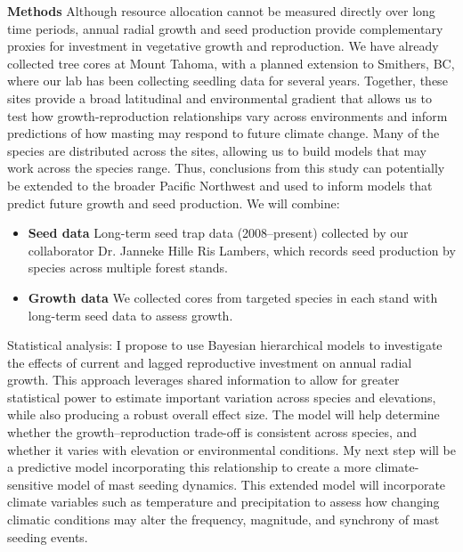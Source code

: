 \documentclass[12pt]{article}
\begin{document}
\textbf{Methods}
Although resource allocation cannot be measured directly over long time periods, annual radial growth and seed production provide complementary proxies for investment in vegetative growth and reproduction. We have already collected tree cores at Mount Tahoma, with a planned extension to Smithers, BC, where our lab has been collecting seedling data for several years. Together, these sites provide a broad latitudinal and environmental gradient that allows us to test how growth-reproduction relationships vary across environments and inform predictions of how masting may respond to future climate change\citep{hacket2021climate}. Many of the species are distributed across the sites, allowing us to build models that may work across the species range. Thus, conclusions from this study can potentially be extended to the broader Pacific Northwest and used to inform models that predict future growth and seed production. We will combine:

\begin{itemize}
\item \textbf{Seed data} Long-term seed trap data (2008–present) collected by our collaborator Dr. Janneke Hille Ris Lambers, which records seed production by species across multiple forest stands.

\item \textbf{Growth data} We collected cores from targeted species in each stand with long-term seed data to assess growth. 
\end{itemize}

Statistical analysis: I propose to use Bayesian hierarchical models to investigate the effects of current and lagged reproductive investment on annual radial growth. This approach leverages shared information to allow for greater statistical power to estimate important variation across species and elevations, while also producing a robust overall effect size. The model will help determine whether the growth–reproduction trade-off is consistent across species, and whether it varies with elevation or environmental conditions. My next step will be a predictive model incorporating this relationship to create a more climate-sensitive model of mast seeding dynamics. This extended model will incorporate climate variables such as temperature and precipitation to assess how changing climatic conditions may alter the frequency, magnitude, and synchrony of mast seeding events.
	
\end{document}
